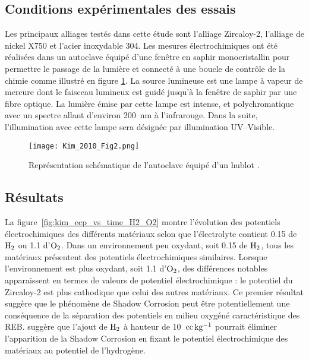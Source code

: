 \begin{refsection}
    \subsection{Conditions expérimentales des essais}

    Les principaux alliages testés dans cette étude sont l’alliage Zircaloy-2, l’alliage de nickel X750 et
    l’acier inoxydable 304. Les mesures électrochimiques ont été réalisées dans un autoclave équipé d’une fenêtre en saphir
    monocristallin pour permettre le passage de la lumière et connecté à une boucle de contrôle de la chimie comme illustré 
    en figure \ref{fig:kim_autoclave}. La source lumineuse est une lampe à vapeur de mercure dont le faisceau lumineux est
    guidé jusqu'à la fenêtre de saphir par une
    fibre optique. La lumière émise par cette lampe est intense, et polychromatique avec un spectre allant d'environ 
    \SI{200}{\nano\meter} à l'infrarouge. Dans la suite, l'illumination avec cette lampe sera désignée par illumination
    UV--Visible. 


        \begin{figure}[H] 
            \centering 
            \texttt{[image: Kim\_2010\_Fig2.png]} 
            \caption[Représentation schématique de l'autoclave équipé d'un hublot.]
            {Représentation schématique de l'autoclave équipé d'un hublot \citep{Kim2010}.} 
            \label{fig:kim_autoclave} 
        \end{figure}

    \subsection{Résultats}

    La figure~\ref{fig:kim_ecp_vs_time_H2_O2} montre l’évolution des potentiels électrochimiques des différents
    matériaux selon que l’électrolyte contient \SI{0.15}{\ppm} de $\rm H_2$ ou \SI{1.1}{\ppm} d’$\rm O_2$. Dans un
    environnement peu oxydant, soit \SI{0.15}{\ppm} de $\rm H_2$, tous les matériaux présentent des potentiels
    électrochimiques similaires. Lorsque l’environnement est plus oxydant, soit \SI{1.1}{\ppm} d’$\rm O_2$, des
    différences notables apparaissent en termes de valeurs de potentiel électrochimique : le potentiel du Zircaloy-2 est
    plus cathodique que celui des autres matériaux. Ce premier résultat suggère que le phénomène de Shadow Corrosion
    peut être potentiellement une conséquence de la séparation des potentiels en milieu oxygéné caractéristique des REB.
    \citet{Cox2005} suggère que l’ajout de $\rm H_2$ à hauteur de 10~$\rm cc \, kg^{-1}$ pourrait éliminer l’apparition de la Shadow
    Corrosion en fixant le potentiel électrochimique des matériaux au potentiel de l’hydrogène.


\end{refsection}
